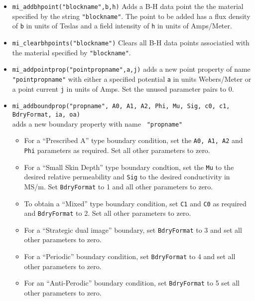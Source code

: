\begin{itemize}
\item{\tt mi\_addbhpoint("blockname",b,h)} Adds a B-H data point the
the material specified by the string {\tt "blockname"}.  The point to be added
has a flux density of {\tt b} in units of Teslas and a field
intensity of {\tt h} in units of Amps/Meter.

\item{\tt mi\_clearbhpoints("blockname")} Clears all B-H data points
associatied with the material specified by {\tt "blockname"}.

\item{\tt mi\_addpointprop("pointpropname",a,j)}
adds a new point property of name {\tt "pointpropname"} with either
a specified potential {\tt a} in units Webers/Meter
or a point current {\tt j} in units of Amps. Set the
unused parameter pairs to 0.

\item{\tt mi\_addboundprop("propname", A0, A1, A2, Phi, Mu, Sig, c0, c1,
BdryFormat, ia, oa)} \\ adds a new boundary property with name {\tt
"propname"}
        \begin{itemize}
        \item For a ``Prescribed A'' type boundary condition, set the {\tt A0,
        A1, A2} and {\tt Phi} parameters as required. Set all other
        parameters to zero.

        \item For a ``Small Skin Depth'' type boundary condtion, set the {\tt Mu}
        to the desired relative permeability and {\tt Sig} to the desired
        conductivity in MS/m.  Set {\tt BdryFormat} to 1 and all other
        parameters to zero.

        \item To obtain a ``Mixed'' type boundary condition, set {\tt C1} and
        {\tt C0} as required and {\tt BdryFormat} to 2.  Set all other
        parameters to zero.

        \item For a ``Strategic dual image'' boundary, set {\tt BdryFormat} to 3
        and set all other parameters to zero.

        \item For a ``Periodic'' boundary condition, set {\tt BdryFormat} to 4 and
        set all other parameters to zero.

        \item For an ``Anti-Perodic'' boundary condition, set {\tt BdryFormat} to
        5 set all other parameters to zero.
        

\end{itemize}
\end{itemize}
